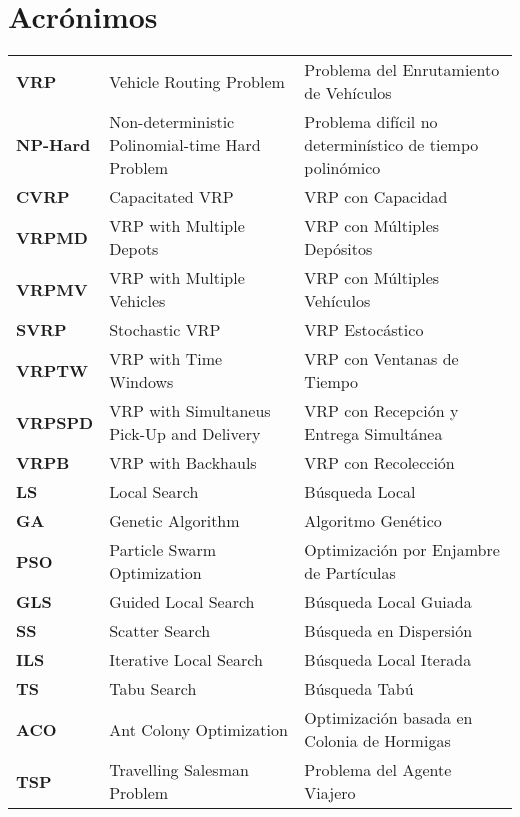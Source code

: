 \chapter*{Acrónimos}

\newcommand{\TERM}[3]{
	\textbf{#1} & #3 & #2 \\[5pt]
}

\begin{longtable}{p{1in}p{2.2in}p{3in}}

		\TERM{VRP}{Problema del Enrutamiento de Vehículos}{Vehicle Routing Problem}
		\TERM{NP-Hard}{Problema difícil no determinístico de tiempo polinómico}{Non-deterministic Polinomial-time Hard Problem}
		\TERM{CVRP}{VRP con Capacidad}{Capacitated VRP}
		\TERM{VRPMD}{VRP con Múltiples Depósitos}{VRP with Multiple Depots}
		\TERM{VRPMV}{VRP con Múltiples Vehículos}{VRP with Multiple Vehicles}
		\TERM{SVRP}{VRP Estocástico}{Stochastic VRP}
		\TERM{VRPTW}{VRP con Ventanas de Tiempo}{VRP with Time Windows}
		\TERM{VRPSPD}{VRP con Recepción y Entrega Simultánea}{VRP with Simultaneus Pick-Up and Delivery}
		\TERM{VRPB}{VRP con Recolección}{VRP with Backhauls}
		\TERM{LS}{Búsqueda Local}{Local Search}
		\TERM{GA}{Algoritmo Genético}{Genetic Algorithm}
		\TERM{PSO}{Optimización por Enjambre de Partículas}{Particle Swarm Optimization}
		\TERM{GLS}{Búsqueda Local Guiada}{Guided Local Search}
		\TERM{SS}{Búsqueda en Dispersión}{Scatter Search}
		\TERM{ILS}{Búsqueda Local Iterada}{Iterative Local Search}
		\TERM{TS}{Búsqueda Tabú}{Tabu Search}
		\TERM{ACO}{Optimización basada en Colonia de Hormigas}{Ant Colony Optimization}
		\TERM{TSP}{Problema del Agente Viajero}{Travelling Salesman Problem}

\end{longtable}

\newpage

